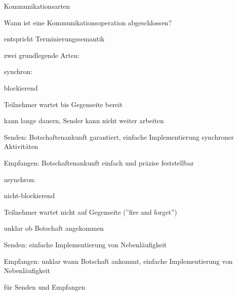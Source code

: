 \documentclass[10pt]{article}
\begin{document}
\begin{itemize*}
Kommunikationsarten
\begin{itemize*}
  \item Wann ist eine Kommunikationsoperation abgeschlossen?
  \item entspricht Terminierungssemantik
  \item zwei grundlegende Arten:
  \begin{itemize*}
    \item synchron:
    \begin{itemize*}
      \item blockierend
      \item Teilnehmer wartet bis Gegenseite bereit
      \item kann lange dauern, Sender kann nicht weiter arbeiten
      \item Senden: Botschaftenankunft garantiert, einfache Implementierung synchroner Aktivitäten
      \item Empfangen: Botschaftenankunft einfach und präzise feststellbar
    \end{itemize*}
    \item asynchron:
    \begin{itemize*}
      \item nicht-blockierend
      \item Teilnehmer wartet nicht auf Gegenseite (”fire and forget”)
      \item unklar ob Botschaft angekommen
      \item Senden: einfache Implementierung von Nebenläufigkeit
      \item Empfangen: unklar wann Botschaft ankommt, einfache Implementierung von Nebenläufigkeit
    \end{itemize*}
    \item für Senden und Empfangen
  \end{itemize*}
\end{itemize*}



\end{itemize*}
\end{document}
